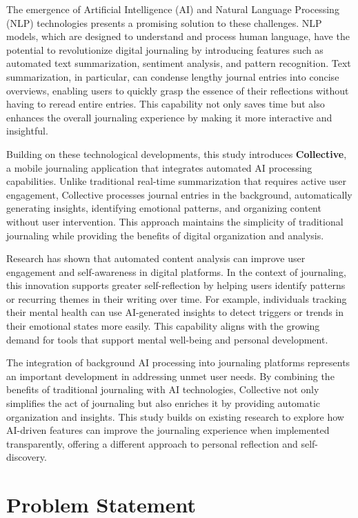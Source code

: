 The emergence of Artificial Intelligence (AI) and Natural Language Processing (NLP) technologies presents a promising solution to these challenges. NLP models, which are designed to understand and process human language, have the potential to revolutionize digital journaling by introducing features such as automated text summarization, sentiment analysis, and pattern recognition. Text summarization, in particular, can condense lengthy journal entries into concise overviews, enabling users to quickly grasp the essence of their reflections without having to reread entire entries. This capability not only saves time but also enhances the overall journaling experience by making it more interactive and insightful.

Building on these technological developments, this study introduces \textbf{Collective}, a mobile journaling application that integrates automated AI processing capabilities. Unlike traditional real-time summarization that requires active user engagement, Collective processes journal entries in the background, automatically generating insights, identifying emotional patterns, and organizing content without user intervention. This approach maintains the simplicity of traditional journaling while providing the benefits of digital organization and analysis.

Research has shown that automated content analysis can improve user engagement and self-awareness in digital platforms. In the context of journaling, this innovation supports greater self-reflection by helping users identify patterns or recurring themes in their writing over time. For example, individuals tracking their mental health can use AI-generated insights to detect triggers or trends in their emotional states more easily. This capability aligns with the growing demand for tools that support mental well-being and personal development.

The integration of background AI processing into journaling platforms represents an important development in addressing unmet user needs. By combining the benefits of traditional journaling with AI technologies, Collective not only simplifies the act of journaling but also enriches it by providing automatic organization and insights. This study builds on existing research to explore how AI-driven features can improve the journaling experience when implemented transparently, offering a different approach to personal reflection and self-discovery.

\section{Problem Statement}\label{sec:problem}

